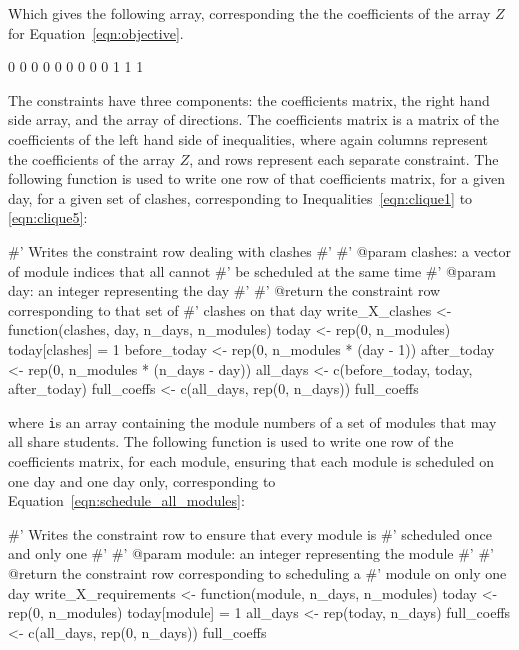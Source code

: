 Which gives the following array, corresponding the the coefficients of the array $Z$ for Equation~\ref{eqn:objective}.

\begin{Rout}
[1] 0 0 0 0 0 0 0 0 0 1 1 1
\end{Rout}

The constraints have three components: the coefficients matrix, the right hand side array, and the array of directions.
The coefficients matrix is a matrix of the coefficients of the left hand side of inequalities, where again columns represent the coefficients of the array $Z$, and rows represent each separate constraint.
The following function is used to write one row of that coefficients matrix, for a given day, for a given set of clashes, corresponding to Inequalities~\ref{eqn:clique1} to \ref{eqn:clique5}:

\begin{Rin}
#' Writes the constraint row dealing with clashes
#'
#' @param clashes: a vector of module indices that all cannot
#'                 be scheduled at the same time
#' @param day: an integer representing the day
#'
#' @return the constraint row corresponding to that set of
#'         clashes on that day
write_X_clashes <- function(clashes, day, n_days, n_modules){
  today <- rep(0, n_modules)
  today[clashes] = 1
  before_today <- rep(0, n_modules * (day - 1))
  after_today <- rep(0, n_modules * (n_days - day))
  all_days <- c(before_today, today, after_today)
  full_coeffs <- c(all_days, rep(0, n_days))
  full_coeffs
}
\end{Rin}

where \texttt is an array containing the module numbers of a set of modules that may all share students.
The following function is used to write one row of the coefficients matrix, for each module, ensuring that each module is scheduled on one day and one day only, corresponding to Equation~\ref{eqn:schedule_all_modules}:

\begin{Rin}
#' Writes the constraint row to ensure that every module is
#' scheduled once and only one
#'
#' @param module: an integer representing the module
#'
#' @return the constraint row corresponding to scheduling a
#'         module on only one day
write_X_requirements <- function(module, n_days, n_modules){
  today <- rep(0, n_modules)
  today[module] = 1
  all_days <- rep(today, n_days)
  full_coeffs <- c(all_days, rep(0, n_days))
  full_coeffs
}
\end{Rin}


